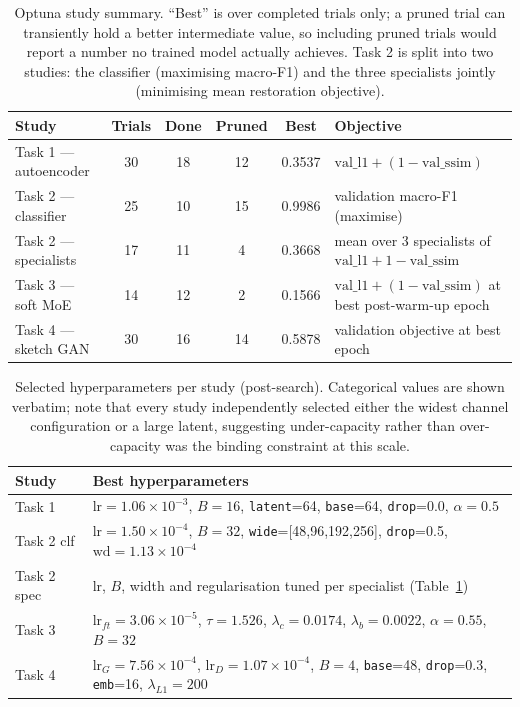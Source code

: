 \documentclass[journal]{IEEEtran}
\begin{document}
\begin{table}[t]
\caption{Optuna study summary. ``Best'' is over completed trials only; a pruned trial can transiently hold a better intermediate value, so including pruned trials would report a number no trained model actually achieves. Task 2 is split into two studies: the classifier (maximising macro-F1) and the three specialists jointly (minimising mean restoration objective).}
\label{tab:optuna}
\centering
\scriptsize
\setlength{\tabcolsep}{5pt}
\begin{tabular}{@{}lccccp{6.1cm}@{}}
\toprule
\textbf{Study} & \textbf{Trials} & \textbf{Done} & \textbf{Pruned} & \textbf{Best} & \textbf{Objective}\\
\midrule
Task 1 --- autoencoder      & 30 & 18 & 12 & 0.3537 & $\mathrm{val\_l1} + (1-\mathrm{val\_ssim})$\\
Task 2 --- classifier       & 25 & 10 & 15 & 0.9986 & validation macro-F1 (maximise)\\
Task 2 --- specialists      & 17 & 11 & 4  & 0.3668 & mean over 3 specialists of $\mathrm{val\_l1}+1-\mathrm{val\_ssim}$\\
Task 3 --- soft MoE         & 14 & 12 & 2  & 0.1566 & $\mathrm{val\_l1}+(1-\mathrm{val\_ssim})$ at best post-warm-up epoch\\
Task 4 --- sketch GAN       & 30 & 16 & 14 & 0.5878 & validation objective at best epoch\\
\bottomrule
\end{tabular}
\end{table}

\begin{table}[t]
\caption{Selected hyperparameters per study (post-search). Categorical values are shown verbatim; note that every study independently selected either the widest channel configuration or a large latent, suggesting under-capacity rather than over-capacity was the binding constraint at this scale.}
\label{tab:best}
\centering
\scriptsize
\setlength{\tabcolsep}{3.2pt}
\begin{tabular}{@{}lp{6.0cm}@{}}
\toprule
\textbf{Study} & \textbf{Best hyperparameters}\\
\midrule
Task 1 & $\mathrm{lr}=1.06{\times}10^{-3}$, $B=16$, \texttt{latent}=64, \texttt{base}=64, \texttt{drop}=0.0, $\alpha=0.5$\\
Task 2 clf & $\mathrm{lr}=1.50{\times}10^{-4}$, $B=32$, \texttt{wide}=[48,96,192,256], \texttt{drop}=0.5, $\mathrm{wd}=1.13{\times}10^{-4}$\\
Task 2 spec & $\mathrm{lr}$, $B$, width and regularisation tuned per specialist (Table~\ref{tab:optuna})\\
Task 3 & $\mathrm{lr}_{ft}=3.06{\times}10^{-5}$, $\tau=1.526$, $\lambda_c=0.0174$, $\lambda_b=0.0022$, $\alpha=0.55$, $B=32$\\
Task 4 & $\mathrm{lr}_G=7.56{\times}10^{-4}$, $\mathrm{lr}_D=1.07{\times}10^{-4}$, $B=4$, \texttt{base}=48, \texttt{drop}=0.3, \texttt{emb}=16, $\lambda_{L1}=200$\\
\bottomrule
\end{tabular}
\end{table}
\end{document}
